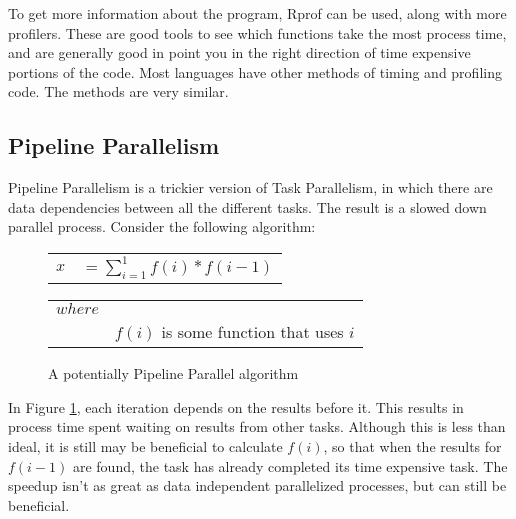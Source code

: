 To get more information about the program, Rprof can be used, along with more profilers. These are good 
tools to see which functions take the most process time, and are generally good in point you in the right 
direction of time expensive portions of the code. Most languages have other methods of timing and profiling code. The methods are very similar.

\subsection{Pipeline Parallelism}
Pipeline Parallelism is a trickier version of Task Parallelism, in which there are data dependencies between
all the different tasks. The result is a slowed down parallel process. Consider the following algorithm:

\begin{figure}[h]
	\begin{center}
		\LARGE
		\begin{tabular}{l r}
			$ x $		&	$ = \sum_{i = 1}^1 f(i) * f(i - 1)$ \\
		\end{tabular}

		\normalsize
		\begin{tabular}{l l}
			$ where $  & \\
					&	$ f(i) $ is some function that uses $i$ \\
		\end{tabular}
		\caption{A potentially Pipeline Parallel algorithm} 
		\label{pipe_par}
	\end{center}
\end{figure}
\normalsize

In Figure \ref{pipe_par}, each iteration depends on the results before it. This results in process time spent 
waiting on results from other tasks. Although this is less than ideal, it is still may be beneficial to calculate
$f(i)$, so that when the results for $f(i - 1)$ are found, the task has already completed its time expensive 
task. The speedup isn't as great as data independent parallelized processes, but can still be beneficial.




